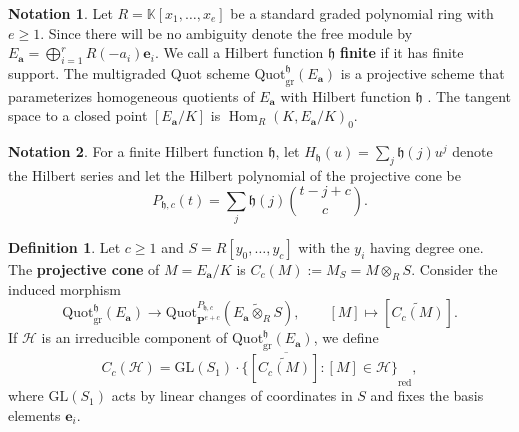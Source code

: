 \documentclass[leqno,11pt,a4paper]{amsart}
\theoremstyle{definition}
\newtheorem{notation}[notation]{Notation}
\newtheorem{definition}[definition]{Definition}
\numberwithin{equation}{section}
\newcommand{\kk}{\mathbb{K}}
\newcommand{\bfa}{\mathbf{a}}
\newcommand{\GL}{\mathrm{GL}}
\newcommand{\Quot}{\mathrm{Quot}}
\newcommand{\PP}{\mathbf{P}}
\newcommand{\mfh}{\mathfrak{h}}
\newcommand{\bfe}{\mathbf{e}}
\newcommand{\HH}{\mathcal{H}}
\DeclareMathOperator{\Hom}{Hom}
\begin{document}
\begin{notation}
Let $R=\kk[x_1,\ldots,x_e]$ be a standard graded polynomial ring with $e\geq1$.
Since there will be no ambiguity denote the free module by $E_\bfa=\bigoplus_{i=1}^r R(-a_i)\bfe_i$. 
We call a Hilbert function $\mfh$ \textbf{finite} if it has finite support.
The multigraded Quot scheme $\Quot^{\mfh}_{\mathrm{gr}}(E_\bfa)$ is a projective scheme that parameterizes homogeneous quotients of $E_\bfa$ with Hilbert function $\mfh$ \cite[Section 6.2]{Haiman_Sturmfels__multigraded}. The tangent space to a closed point $[E_\bfa/K]$ is $\Hom_R(K,E_\bfa/K)_0$.
\end{notation}

\begin{notation} For a finite Hilbert function $\mfh$, let $H_{\mfh}(u)=\sum_j\mfh(j)u^j$ denote the Hilbert series and let the Hilbert polynomial of the projective cone be
$$
P_{\mfh,c}(t)=\sum_j\mfh(j)\binom{t-j+c}{c}.
$$
\end{notation}



\begin{definition} Let $c \geq 1$ and $S = R[y_0,\dots,y_c]$ with the $y_i$ having degree one. The \textbf{projective cone} of $M = E_\bfa/K$ is 
$C_c(M) := M_S = M \otimes_R S$. Consider the induced morphism
$$
\Quot_{\mathrm{gr}}^{\mfh}(E_\bfa) \to  \Quot^{P_{\mfh,c}}_{\PP^{e+c}}(\widetilde{E_\bfa\otimes_R S}), \qquad [M] \mapsto [\widetilde{C_c(M)}].
$$
If $\HH$ is an irreducible component of $\Quot_{\mathrm{gr}}^{\mfh}(E_{\bfa})$, we define
$$
C_c(\HH) = \overline{\GL(S_1)\cdot\{[\widetilde{C_c(M)}]:[M]\in\HH\}}_{\text{red}},
$$
where $\GL(S_1)$ acts by linear changes of coordinates in $S$ and fixes the basis elements $\bfe_i$.
\end{definition}
\end{document}
